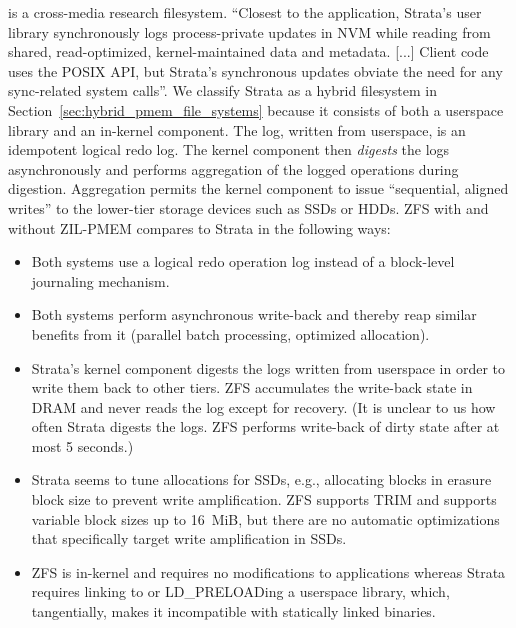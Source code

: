 \documentclass[12pt,a4paper,twoside]{book}
\begin{document}
 is a cross-media research filesystem.
“Closest to the application, Strata’s user library synchronously logs process-private updates in NVM while reading from shared, read-optimized, kernel-maintained data and metadata.
    [...]
Client code uses the POSIX API, but Strata’s synchronous updates obviate the need for any sync-related system calls”.
We classify Strata as a hybrid filesystem in Section~\ref{sec:hybrid_pmem_file_systems} because it consists of both a userspace library and an in-kernel component.
The log, written from userspace, is an idempotent logical redo log.
The kernel component then \textit{digests} the logs asynchronously and performs aggregation of the logged operations during digestion.
Aggregation permits the kernel component to issue “sequential, aligned writes” to the lower-tier storage devices such as SSDs or HDDs.
ZFS with and without ZIL-PMEM compares to Strata in the following ways:
\begin{itemize}[noitemsep,beginpenalty=100000,midpenalty=100000]
    \item Both systems use a logical redo operation log instead of a block-level journaling mechanism.
    \item Both systems perform asynchronous write-back and thereby reap similar benefits from it (parallel batch processing, optimized allocation).
    \item Strata’s kernel component digests the logs written from userspace in order to write them back to other tiers.
          ZFS accumulates the write-back state in DRAM and never reads the log except for recovery.
          (It is unclear to us how often Strata digests the logs. ZFS performs write-back of dirty state after at most 5 seconds.)
    \item Strata seems to tune allocations for SSDs, e.g., allocating blocks in erasure block size to prevent write amplification.
          ZFS supports TRIM and supports variable block sizes up to 16~MiB, but there are no automatic optimizations that specifically target write amplification in SSDs.
    \item ZFS is in-kernel and requires no modifications to applications whereas Strata requires linking to or LD\_PRELOADing a userspace library, which, tangentially, makes it incompatible with statically linked binaries.
\end{itemize}
\end{document}

